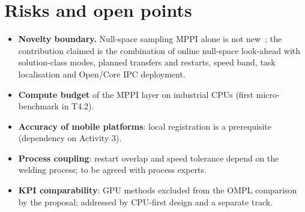 \documentclass[10pt,a4paper]{article}
\begin{document}
\section{Risks and open points}
\begin{itemize}
\item \textbf{Novelty boundary.} Null-space sampling MPPI alone is not new~\cite{wang2024constrainedpi}; the contribution claimed is the combination of online null-space look-ahead with solution-class modes, planned transfers and restarts, speed band, task localisation and Open/Core IPC deployment.
\item \textbf{Compute budget} of the MPPI layer on industrial CPUs (first micro-benchmark in T4.2).
\item \textbf{Accuracy of mobile platforms}: local registration is a prerequisite (dependency on Activity 3).
\item \textbf{Process coupling}: restart overlap and speed tolerance depend on the welding process; to be agreed with process experts.
\item \textbf{KPI comparability}: GPU methods excluded from the OMPL comparison by the proposal; addressed by CPU-first design and a separate track.
\end{itemize}



\end{document}
